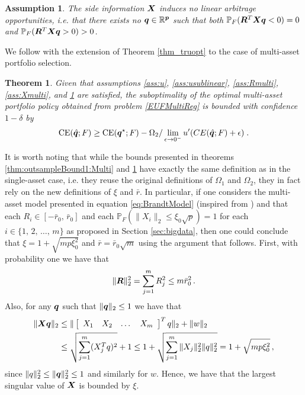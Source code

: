 \documentclass[]{interact}
\theoremstyle{plain}%
\theoremstyle{definition}
\theoremstyle{remark}
\def\Prob{{\mathbb P}}
\newcommand{\0}{\V{0}}
\newcommand{\1}{\V{1}}
\renewcommand{\Re}{\mathbb{R}}
\def\CE{\mathop{\rm CE}}
\theoremstyle{plain}
\newtheorem{thm}{Theorem}
\newtheorem{assumption}{Assumption}
\theoremstyle{definition}
\begin{document}
\begin{assumption}\label{ass:arbitrageMulti}
  The side information ${\boldsymbol{X}}$ induces no linear arbitrage opportunities, i.e. that there exists no $\vq\in\Re^\vp$ such that  both
  $\Prob_F(\vR^T \vX\vq < 0) = 0$ and $\Prob_F(\vR^T \vX \vq > 0) > 0$.
\end{assumption}

We follow with the extension of Theorem \ref{thm_truopt} to the case of multi-asset portfolio selection.

\begin{thm}
  \label{thm_truoptMulti}
  Given that assumptions \ref{ass:u}, \ref{ass:usublinear}, \ref{ass:Rmulti}, \ref{ass:Xmulti},  and \ref{ass:arbitrageMulti} are satisfied, the  suboptimality of  the optimal multi-asset portfolio policy obtained from problem \eqref{EUFMultiReg} is bounded with confidence $1-\delta$ by
  \[  \CE(\vqhat;F) \geq \CE(\vq^\star;F) - \Omega_2/\lim_{\epsilon\to0^{-}}u'(CE(\vqhat;F)+\epsilon)\;.  \]
\end{thm}

It is worth noting that while the bounds presented in theorems \ref{thm:outsampleBound1:Multi} and \ref{thm_truoptMulti} have exactly the same definition as in the single-asset case, i.e. they reuse the original definitions of $\Omega_1$ and $\Omega_2$, they in fact rely on the new definitions of $\xi$ and $\bar{r}$. In particular, if one considers the multi-asset model presented in equation  \eqref{eq:BrandtModel} (inspired from \cite{brandt2009parametric}) and that each $R_i\in [-\bar{r}_0,\,\bar{r}_0]$ and each $\Prob_F(\|X_i\|_2 \leq \xi_0\sqrt{p})=1$ for each $i\in\{ 1,\,2,\,\dots,\,m \}$ as proposed in Section \ref{sec:bigdata}, then one could conclude that $\xi=1+\sqrt{mp\xi_0^2}$ and $\bar{r}=\bar{r}_0\sqrt{m}$ using the argument that follows. First, with probability one we have that
\[\|{\boldsymbol{R}}\|_2^2 = \sum_{j=1}^m R_j^2 \leq m\bar{r}_0^2\,.\]
Also, for any ${\boldsymbol{q}}$ such that $\|{\boldsymbol{q}}\|_2\leq 1$ we have that
\begin{align*}
\|{\boldsymbol{X}}{\boldsymbol{q}}\|_2 &\leq \|\left[\begin{array}{ccccc}X_1 & X_2 & \dots & X_m\end{array}\right]^T q\|_2 + \|w\|_2 \\
&\leq \sqrt{\sum_{j=1}^m (X_j^Tq)^2}+1\leq  1+ \sqrt{\sum_{j=1}^m \|X_j\|_2^2\|q\|_2^2} = 1+\sqrt{mp\xi_0^2}\,,
\end{align*}
since $\|q\|_2^2\leq \|{\boldsymbol{q}}\|_2^2\leq 1$ and similarly for $w$. Hence, we have that the largest singular value of ${\boldsymbol{X}}$ is bounded by $\xi$.
\end{document}

